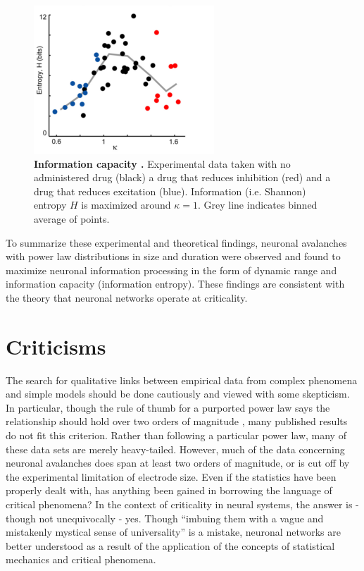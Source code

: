 \documentclass[12pt]{article}
\begin{document}
\begin{figure}      
  \begin{center}    
 \includegraphics[width=.50\textwidth]{entropyplenz}    
    \caption{\textbf{Information capacity \cite{Shew2011a}.} Experimental data taken with no administered drug (black) a drug that reduces inhibition (red) and a drug that reduces excitation (blue). Information (i.e. Shannon) entropy $H$ is maximized around $\kappa = 1$. Grey line indicates binned average of points.}
   \label{Figure::Entropy / information maximized experimental}   
  \end{center}     
   \end{figure}

To summarize these experimental and theoretical findings, neuronal avalanches with power law distributions in size and duration were observed and found to maximize neuronal information processing in the form of dynamic range and information capacity (information entropy). These findings are consistent with the theory that neuronal networks operate at criticality. 



\section*{Criticisms} The search for qualitative links between empirical data from complex phenomena and simple models should be done cautiously and viewed with some skepticism. In particular, though the rule of thumb for a purported power law says the relationship should hold over two orders of magnitude \cite{Sethna2011a}, many published results do not fit this criterion. Rather than following a particular power law, many of these data sets are merely heavy-tailed. However, much of the data concerning neuronal avalanches does span at least two orders of magnitude, or is cut off by the experimental limitation of electrode size. Even if the statistics have been properly dealt with, has anything been gained in borrowing the language of critical phenomena? In the context of criticality in neural systems, the answer is - though not unequivocally - yes. Though ``imbuing them with a vague and mistakenly mystical sense of universality'' \cite{Stumpf2012a} is a mistake, neuronal networks are better understood as a result of the application of the concepts of statistical mechanics and critical phenomena. 
\end{document}
